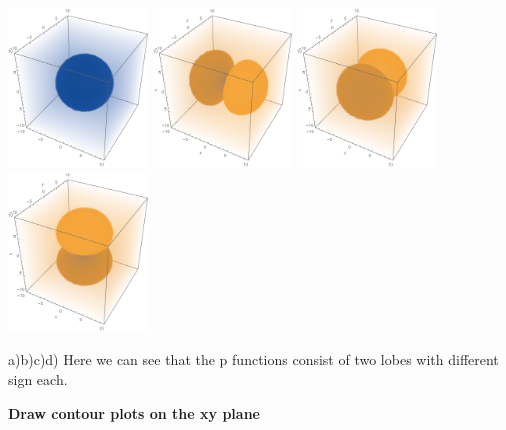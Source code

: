 \begin{questions}
\begin{solution}
  \includegraphics[width=37mm]{s.png}
  \includegraphics[width=37mm]{px_3d.png}
  \includegraphics[width=37mm]{py_3d.png}
  \includegraphics[width=37mm]{pz_3d.png}\label{fig:3d}

  \hspace{1.7cm}a)\hspace{35mm}b)\hspace{35mm}c)\hspace{35mm}d)
  \vspace{0.5cm}
  Here we can see that the p functions consist of two lobes with different sign each.\clearpage

  \textbf{Draw contour plots on the xy plane}


\end{solution}
\end{questions}
